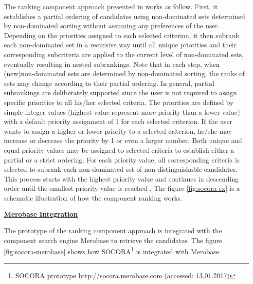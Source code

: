 The ranking component approach presented in \cite{Kessel2016} works as follow. First, it establishes a partial ordering of candidates using non-dominated sets determined by non-dominated sorting without assuming any preferences of the user. Depending on the priorities assigned to each selected criterion, it then subrank each non-dominated set in a recursive way until all unique priorities and their corresponding subcriteria are applied to the current level of non-dominated sets, eventually resulting in nested subrankings. Note that in each step, when (new)non-dominated sets are determined by non-dominated sorting, the ranks of sets may change according to their partial ordering. In general, partial subrankings are deliberately supported since the user is not required to assign specific priorities to all his/her selected criteria. The priorities are defined by simple integer values (highest value represent more priority than a lower value) with a default priority assignment of 1 for each selected criterion. If the user wants to assign a higher or lower priority to a selected criterion, he/she may increase or decrease the priority by 1 or even a larger number. Both unique and equal priority values may be assigned to selected criteria to establish either a partial or a strict ordering. For each priority value, all corresponding criteria is selected to subrank each non-dominated set of non-distinguishable candidates. This process starts with the highest priority value and continues in descending order until the smallest priority value is reached \cite{Kessel2016}. The figure \ref{fig:socora-ex} is a schematic illustration of how the component ranking works.

\textbf{\underline{Merobase Integration}}

The prototype of the ranking component approach is integrated with the component search engine Merobase to retrieve the candidates. The figure \ref{fig:socora-merobase} shows how SOCORA\footnote{SOCORA prototype http://socora.merobase.com (accessed: 13.01.2017)} is integrated with Merobase.

